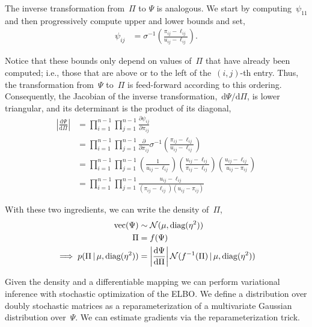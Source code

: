The inverse transformation from~${\Pi}$ to $\Psi$ is analogous.
We start by computing~$\psi_{11}$ and then progressively compute
upper and lower bounds and set,
\begin{align}
\psi_{ij} &= \sigma^{-1} \left( \frac{{\pi}_{ij} - \ell_{ij}}{u_{ij} - \ell_{ij}} \right ).
\end{align}


Notice that these bounds only depend on values of~${\Pi}$ that
have already been computed; i.e., those that are above or to the left of
the~$(i,j)$-th entry. Thus, the transformation from~$\Psi$ to~${\Pi}$
is feed-forward according to this ordering.  Consequently, the
Jacobian of the inverse transformation,~$\mathrm{d}\Psi / \mathrm{d} \Pi$,
is lower triangular, and its determinant is the product of its diagonal,
\begin{align}
\left| \frac{\mathrm{d} \Psi } {\mathrm{d} \Pi} \right|
&= \prod_{i=1}^{n-1} \prod_{j=1}^{n-1} \frac{\partial \psi_{ij} }{\partial {\pi}_{ij}} \\
&= \prod_{i=1}^{n-1} \prod_{j=1}^{n-1} \frac{\partial}{\partial {\pi}_{ij}}
\sigma^{-1} \left( \frac{{\pi}_{ij} - \ell_{ij}}{u_{ij} - \ell_{ij}} \right ) \\
&= \prod_{i=1}^{n-1} \prod_{j=1}^{n-1}
\left( \frac{1}{u_{ij} - \ell_{ij}} \right )
\left( \frac{u_{ij} - \ell_{ij}}{{\pi}_{ij} - \ell_{ij}} \right )
\left( \frac{u_{ij} - \ell_{ij}}{u_{ij} - {\pi}_{ij}} \right ) \\
&= \prod_{i=1}^{n-1} \prod_{j=1}^{n-1}
\frac{u_{ij} - \ell_{ij}}{({\pi}_{ij} - \ell_{ij}) (u_{ij} - {\pi}_{ij})}
\end{align}

With these two ingredients, we can write the density of~${\Pi}$,
\begin{align}
  \text{vec} (\Psi) &\sim \mathcal{N}(\mu, \textrm{diag}(\eta^2))
  \\
  {\Pi} &= f(\Psi) \\
  \implies
  p(\Pi \, | \, \mu, \textrm{diag}(\eta^2)) &= \left|\frac{\mathrm{d} \Psi }{\mathrm{d} {\Pi}} \right|
  \mathcal{N}(f^{-1}({\Pi}) \, | \, \mu, \textrm{diag}(\eta^2))
\end{align}

Given the density and a differentiable mapping we can perform
variational inference with stochastic optimization of the ELBO.
We define a distribution over doubly stochastic matrices as a
reparameterization of a multivariate Gaussian distribution
over~$\Psi$. We can estimate gradients via the reparameterization
trick.

